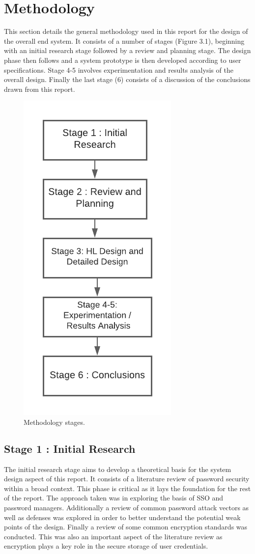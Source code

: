 \section{Methodology}

This section details the general methodology used in this report for the design of the overall end system. It consists of a number of stages (Figure 3.1), beginning with an initial research stage followed by a review and planning stage. The design phase then follows and a system prototype is then developed according to user specifications. Stage 4-5 involves experimentation and results analysis of the overall design. Finally the last stage (6) consists of a discussion of the conclusions drawn from this report.

\begin{figure}[H]
\centering
\includegraphics[width=0.28\columnwidth]{Figures/Fig_43.png}
\caption{Methodology stages.}
\label{fig:gantt}
\end{figure}

\subsection{Stage 1 : Initial Research}

The initial research stage aims to develop a theoretical basis for the system design aspect of this report. It consists of a literature review of password security within a broad context. This phase is critical as it lays the foundation for the rest of the report. The approach taken was in exploring the basis of SSO and password managers. Additionally a review of common password attack vectors as well as defenses was explored in order to better understand the potential weak points of the design. Finally a review of some common encryption standards was conducted. This was also an important aspect of the literature review as encryption plays a key role in the secure storage of user credentials.

